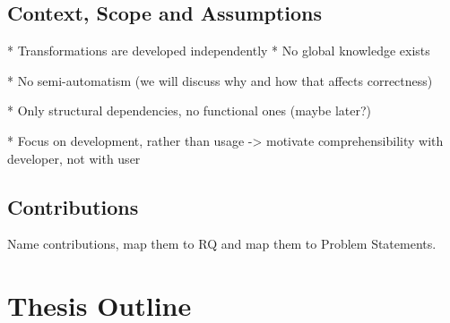 






\subsection{Context, Scope and Assumptions}

* Transformations are developed independently
* No global knowledge exists

* No semi-automatism (we will discuss why and how that affects correctness)


* Only structural dependencies, no functional ones (maybe later?)


* Focus on development, rather than usage -> motivate comprehensibility with developer, not with user

\subsection{Contributions}

Name contributions, map them to RQ and map them to Problem Statements.



\section{Thesis Outline}







